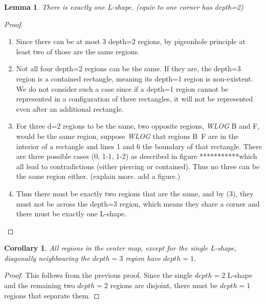 \documentclass{NSF}
\newtheorem{corollary}{Corollary}[theorem]
\newtheorem{lemma}[theorem]{Lemma}
\begin{document}
\begin{lemma}
There is exactly one L-shape. (equiv to one corner has depth=2)
\end{lemma}
\begin{proof}
\begin{enumerate}
\item
Since there can be at most 3 depth=2 regions, by pigeonhole principle at least two of those are the same regions. 
\item 
Not all four depth=2 regions can be the same. If they are, the depth=3 region is a contained rectangle, meaning its depth=1 region is non-existent. We do not consider such a case since if a depth=1 region cannot be represented in a configuration of three rectangles, it will not be represented even after an additional rectangle.
\item 
For three d=2 regions to be the same, two opposite regions, \textit{WLOG} B and F, would be the same region, suppose \textit{WLOG} that regions B~F are in the interior of a rectangle and lines 1 and 6 the boundary of that rectangle. There are three possible cases (0, 1-1, 1-2) as described in figure ***********which all lead to contradictions (either piercing or contained). Thus no three can be the same region either. (explain more. add a figure.)
\item 
Thus there must be exactly two regions that are the same, and by (3), they must not be across the depth=3 region, which means they share a corner and there must be exactly one L-shape.
\end{enumerate}
\end{proof}

\begin{corollary}
All regions in the center map, except for the single L-shape, diagonally neighbouring the $depth=3$ region have $depth=1$.
\end{corollary}
\begin{proof}
This follows from the previous proof. Since the single $depth=2$ L-shape and the remaining two $depth=2$ regions are disjoint, there must be $depth=1$ regions that separate them.
\end{proof}
\end{document}
